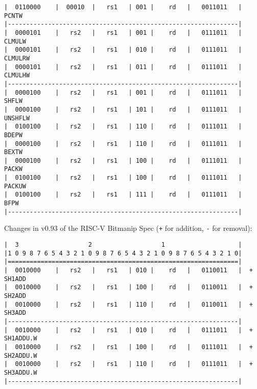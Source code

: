 \begin{minipage}{\linewidth}
\begin{verbatim}
|  0110000    |  00010  |   rs1   | 001 |    rd   |   0011011   |  PCNTW
|---------------------------------------------------------------|
|  0000101    |   rs2   |   rs1   | 001 |    rd   |   0111011   |  CLMULW
|  0000101    |   rs2   |   rs1   | 010 |    rd   |   0111011   |  CLMULRW
|  0000101    |   rs2   |   rs1   | 011 |    rd   |   0111011   |  CLMULHW
|---------------------------------------------------------------|
|  0000100    |   rs2   |   rs1   | 001 |    rd   |   0111011   |  SHFLW
|  0000100    |   rs2   |   rs1   | 101 |    rd   |   0111011   |  UNSHFLW
|  0100100    |   rs2   |   rs1   | 110 |    rd   |   0111011   |  BDEPW
|  0000100    |   rs2   |   rs1   | 110 |    rd   |   0111011   |  BEXTW
|  0000100    |   rs2   |   rs1   | 100 |    rd   |   0111011   |  PACKW
|  0100100    |   rs2   |   rs1   | 100 |    rd   |   0111011   |  PACKUW
|  0100100    |   rs2   |   rs1   | 111 |    rd   |   0111011   |  BFPW
|---------------------------------------------------------------|
\end{verbatim}
\end{minipage}

Changes in v0.93 of the RISC-V Bitmanip Spec ({\tt +} for addition,
{\tt -} for removal):

\begin{minipage}{\linewidth}
\begin{verbatim}
|  3                   2                   1                    |
|1 0 9 8 7 6 5 4 3 2 1 0 9 8 7 6 5 4 3 2 1 0 9 8 7 6 5 4 3 2 1 0|
|===============================================================|
|  0010000    |   rs2   |   rs1   | 010 |    rd   |   0110011   |  + SH1ADD
|  0010000    |   rs2   |   rs1   | 100 |    rd   |   0110011   |  + SH2ADD
|  0010000    |   rs2   |   rs1   | 110 |    rd   |   0110011   |  + SH3ADD
|---------------------------------------------------------------|
|  0010000    |   rs2   |   rs1   | 010 |    rd   |   0111011   |  + SH1ADDU.W
|  0010000    |   rs2   |   rs1   | 100 |    rd   |   0111011   |  + SH2ADDU.W
|  0010000    |   rs2   |   rs1   | 110 |    rd   |   0111011   |  + SH3ADDU.W
|---------------------------------------------------------------|
\end{verbatim}
\end{minipage}

